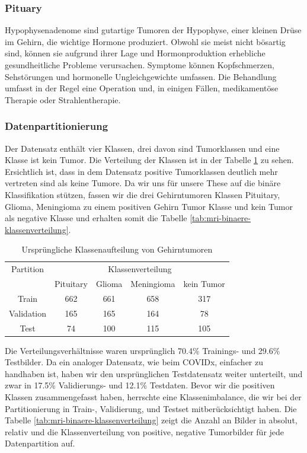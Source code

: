\subsubsection{Pituary}
Hypophysenadenome sind gutartige Tumoren der Hypophyse, einer kleinen Drüse im Gehirn, die wichtige Hormone produziert. Obwohl sie meist nicht bösartig sind, können sie aufgrund ihrer Lage und Hormonproduktion erhebliche gesundheitliche Probleme verursachen. Symptome können Kopfschmerzen, Sehstörungen und hormonelle Ungleichgewichte umfassen. Die Behandlung umfasst in der Regel eine Operation und, in einigen Fällen, medikamentöse Therapie oder Strahlentherapie.

\subsubsection{Datenpartitionierung} \label{chap:Brain-Tumor-Partition}

Der Datensatz enthält vier Klassen, drei davon sind Tumorklassen und eine Klasse ist kein Tumor. Die Verteilung der Klassen ist in der Tabelle \ref{tab:mri-orginale-klassenverteilung} zu sehen. Ersichtlich ist, dass in dem Datensatz positive Tumorklassen deutlich mehr vertreten sind als keine Tumore. Da wir uns für unsere These auf die binäre Klassifikation stützen, fassen wir die drei Gehirntumoren Klassen Pituitary, Glioma, Meningioma zu einem positiven Gehirn Tumor Klasse und kein Tumor als negative Klasse und erhalten somit die Tabelle \ref{tab:mri-binaere-klassenverteilung}.

\begin{table}[ht]
\centering
\begin{tabular}{@{}ccccc@{}}
\toprule
 Partition & \multicolumn{4}{c}{Klassenverteilung}        \\ 
\cmidrule(l){2-5}
           & Pituitary & Glioma & Meningioma & kein Tumor \\ 
\midrule 
Train      & 662 & 661 & 658 & 317 \\
Validation & 165 & 165 & 164 & 78  \\
Test       & 74  & 100 & 115 & 105 \\ 
\bottomrule
\end{tabular}
\caption{Ursprüngliche Klassenaufteilung von Gehirntumoren}
\label{tab:mri-orginale-klassenverteilung}
\end{table}

Die Verteilungsverhältnisse waren ursprünglich 70.4\% Trainings- und 29.6\% Testbilder. Da ein analoger Datensatz, wie beim COVIDx, einfacher zu handhaben ist, haben wir den ursprünglichen Testdatensatz weiter unterteilt, und zwar in 17.5\% Validierungs- und 12.1\% Testdaten. Bevor wir die positiven Klassen zusammengefasst haben, herrschte eine Klassenimbalance, die wir bei der Partitionierung in Train-, Validierung, und Testset mitberücksichtigt haben. Die Tabelle \ref{tab:mri-binaere-klassenverteilung} zeigt die Anzahl an Bilder in absolut, relativ und die Klassenverteilung von positive, negative Tumorbilder für jede Datenpartition auf.

